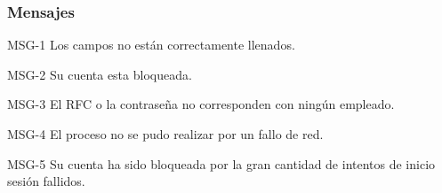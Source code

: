 \subsubsection{Mensajes}

\begin{Citemize}
	\item MSG-1 Los campos no están correctamente llenados. 
	\item MSG-2 Su cuenta esta bloqueada. 
	\item MSG-3 El RFC o la contraseña no corresponden con ningún empleado. 
	\item MSG-4 El proceso no se pudo realizar por un fallo de red. 
	\item MSG-5 Su cuenta ha sido bloqueada por la gran cantidad de intentos de inicio sesión fallidos.
\end{Citemize}

